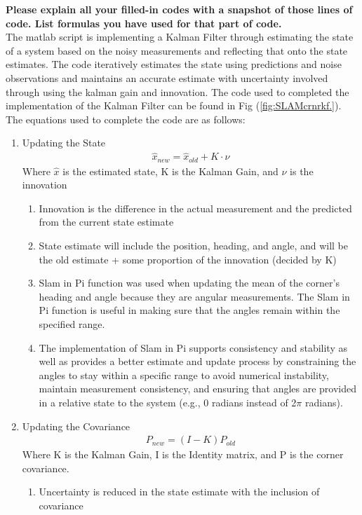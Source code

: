 \textbf{Please explain all your filled-in codes with a snapshot of those lines of code. List formulas you have used for that part of code.}\\
The matlab script is implementing a Kalman Filter through estimating the state of a system based on the noisy measurements and reflecting that onto the state estimates. The code iteratively estimates the state using predictions and noise observations and maintains an accurate estimate with uncertainty involved through using the kalman gain and innovation. The code used to completed the implementation of the Kalman Filter can be found in Fig (\ref{fig:SLAMcrnrkf.}). The equations used to complete the code are as follows:
\begin{enumerate}
    \item Updating the State
    \begin{align}
        \hat{x}_{new} = \hat{x}_{old} + K \cdot \nu
    \end{align}
    Where $\hat{x}$ is the estimated state, K is the Kalman Gain, and $\nu$ is the innovation
    \begin{enumerate}
        \item Innovation is the difference in the actual measurement and the predicted from the current state estimate
        \item State estimate will include the position, heading, and angle, and will be the old estimate + some proportion of the innovation (decided by K)
        \item Slam in Pi function was used when updating the mean of the corner's heading and angle because they are angular measurements. The Slam in Pi function is useful in making sure that the angles remain within the specified range.
        \item The implementation of Slam in Pi supports consistency and stability as well as provides a better estimate and update process by constraining the angles to stay within a specific range to avoid numerical instability, maintain measurement consistency, and ensuring that angles are provided in a relative state to the system (e.g., 0 radians instead of 2$\pi$ radians).
    \end{enumerate}
    \item Updating the Covariance
    \begin{align}
        P_{new} = (I - K) P_{old}
    \end{align}
    Where K is the Kalman Gain, I is the Identity matrix, and P is the corner covariance.
    \begin{enumerate}
        \item Uncertainty is reduced in the state estimate with the inclusion of covariance
    \end{enumerate}
\end{enumerate}
